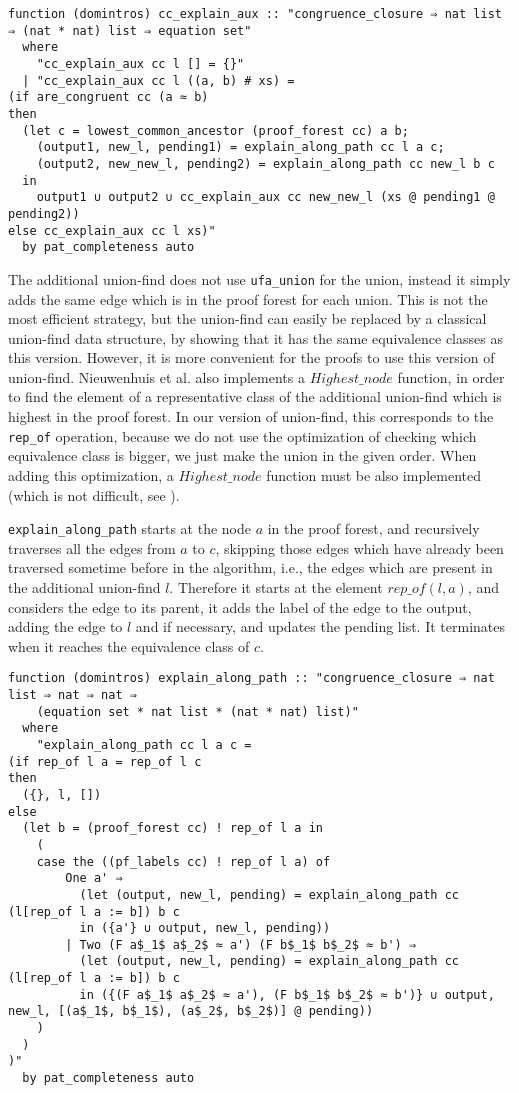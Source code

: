 \begin{lstlisting}
function (domintros) cc_explain_aux :: "congruence_closure ⇒ nat list ⇒ (nat * nat) list ⇒ equation set"
  where
    "cc_explain_aux cc l [] = {}"
  | "cc_explain_aux cc l ((a, b) # xs) =
(if are_congruent cc (a ≈ b)
then
  (let c = lowest_common_ancestor (proof_forest cc) a b;
    (output1, new_l, pending1) = explain_along_path cc l a c;
    (output2, new_new_l, pending2) = explain_along_path cc new_l b c
  in
    output1 ∪ output2 ∪ cc_explain_aux cc new_new_l (xs @ pending1 @ pending2))
else cc_explain_aux cc l xs)"
  by pat_completeness auto
\end{lstlisting}

The additional union-find does not use \lstinline{ufa_union} for the union, instead it simply adds the same edge which is in the proof forest for each union. This is not the most efficient strategy, but the union-find can easily be replaced by a classical union-find data structure, by showing that it has the same equivalence classes as this version. However, it is more convenient for the proofs to use this version of union-find. Nieuwenhuis et al. \cite{Nieuwenhuis} also implements a $Highest\_node$ function, in order to find the element of a representative class of the additional union-find which is highest in the proof forest. In our version of union-find, this corresponds to the \lstinline{rep_of} operation, because we do not use the optimization of checking which equivalence class is bigger, we just make the union in the given order. When adding this optimization, a $Highest\_node$ function must be also implemented (which is not difficult, see \cite{Nieuwenhuis}).

\lstinline{explain_along_path} starts at the node $a$ in the proof forest, and recursively traverses all the edges from $a$ to $c$, skipping those edges which have already been traversed sometime before in the algorithm, i.e., the edges which are present in the additional union-find $l$. Therefore it starts at the element $rep\_of(l, a)$, and considers the edge to its parent, it adds the label of the edge to the output, adding the edge to $l$ and if necessary, and updates the pending list. It terminates when it reaches the equivalence class of $c$.

\begin{lstlisting}
function (domintros) explain_along_path :: "congruence_closure ⇒ nat list ⇒ nat ⇒ nat ⇒
    (equation set * nat list * (nat * nat) list)"
  where
    "explain_along_path cc l a c =
(if rep_of l a = rep_of l c
then
  ({}, l, [])
else
  (let b = (proof_forest cc) ! rep_of l a in
    (
    case the ((pf_labels cc) ! rep_of l a) of
        One a' ⇒
          (let (output, new_l, pending) = explain_along_path cc (l[rep_of l a := b]) b c
          in ({a'} ∪ output, new_l, pending))
        | Two (F a$_1$ a$_2$ ≈ a') (F b$_1$ b$_2$ ≈ b') ⇒
          (let (output, new_l, pending) = explain_along_path cc (l[rep_of l a := b]) b c
          in ({(F a$_1$ a$_2$ ≈ a'), (F b$_1$ b$_2$ ≈ b')} ∪ output, new_l, [(a$_1$, b$_1$), (a$_2$, b$_2$)] @ pending))
    )
  )
)"
  by pat_completeness auto
\end{lstlisting}

